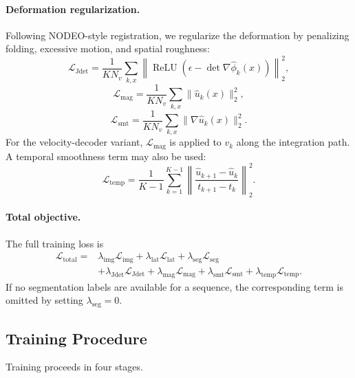 \paragraph{Deformation regularization.}
Following NODEO-style registration, we regularize the deformation by
penalizing folding, excessive motion, and spatial roughness:
\[
    \mathcal{L}_{\mathrm{Jdet}}
    =
    \frac{1}{K N_v}
    \sum_{k,x}
    \left\|
    \operatorname{ReLU}(\epsilon-\det\nabla\widehat\phi_k(x))
    \right\|_2^2 ,
\]
\[
    \mathcal{L}_{\mathrm{mag}}
    =
    \frac{1}{K N_v}
    \sum_{k,x}
    \|\widehat u_k(x)\|_2^2 ,
\]
\[
    \mathcal{L}_{\mathrm{smt}}
    =
    \frac{1}{K N_v}
    \sum_{k,x}
    \|\nabla\widehat u_k(x)\|_2^2 .
\]
For the velocity-decoder variant, $\mathcal{L}_{\mathrm{mag}}$ is applied
to $v_k$ along the integration path. A temporal smoothness term may also
be used:
\[
    \mathcal{L}_{\mathrm{temp}}
    =
    \frac{1}{K-1}
    \sum_{k=1}^{K-1}
    \left\|
    \frac{\widehat u_{k+1}-\widehat u_k}{t_{k+1}-t_k}
    \right\|_2^2 .
\]

\paragraph{Total objective.}
The full training loss is
\[
\begin{aligned}
    \mathcal{L}_{\mathrm{total}}
    =
    &\lambda_{\mathrm{img}}\mathcal{L}_{\mathrm{img}}
    +\lambda_{\mathrm{lat}}\mathcal{L}_{\mathrm{lat}}
    +\lambda_{\mathrm{seg}}\mathcal{L}_{\mathrm{seg}} \\
    &+\lambda_{\mathrm{Jdet}}\mathcal{L}_{\mathrm{Jdet}}
    +\lambda_{\mathrm{mag}}\mathcal{L}_{\mathrm{mag}}
    +\lambda_{\mathrm{smt}}\mathcal{L}_{\mathrm{smt}}
    +\lambda_{\mathrm{temp}}\mathcal{L}_{\mathrm{temp}} .
\end{aligned}
\]
If no segmentation labels are available for a sequence, the corresponding
term is omitted by setting $\lambda_{\mathrm{seg}}=0$.

\subsection{Training Procedure}
\label{sec:training_procedure}

Training proceeds in four stages.

